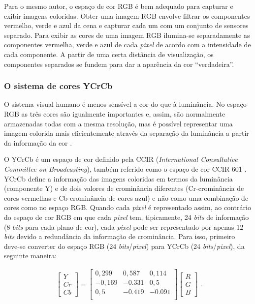 Para o mesmo autor, o espaço de cor RGB é bem adequado para capturar e exibir imagens coloridas. Obter uma imagem RGB envolve filtrar os componentes vermelho, verde e azul da cena e capturar cada um com um conjunto de sensores separado. Para exibir as cores de uma imagem RGB ilumina-se separadamente as componentes vermelha, verde e azul de cada \textit{pixel} de acordo com a intensidade de cada componente. A partir de uma certa distância de visualização, os componentes separados se fundem para dar a aparência da cor \enquote{verdadeira}. 

\subsubsection{O sistema de cores YCrCb}
O sistema visual humano é menos sensível a cor do que à luminância. No espaço RGB as três cores são igualmente importantes e, assim, são normalmente armazenadas todas com a mesma resolução, mas é possível representar uma imagem colorida mais eficientemente através da separação da luminância a partir da informação da cor \cite{richardson2011h}.

O YCrCb é um espaço de cor definido pela CCIR (\textit{International Consultative Committee on Broadcasting}), também referido como o espaço de cor CCIR 601 \cite{acharya2002integrated}. YCrCb define a informação  das imagens coloridas  em termos da luminância (componente Y) e de dois valores de crominância diferentes (Cr-crominância de cores vermelhas e Cb-crominância de cores azul) e não como uma combinação de cores como no espaço RGB. Quando cada \textit{pixel} é representado assim, ao contrário do espaço de cor RGB em que cada \textit{pixel} tem, tipicamente, 24 \textit{bits} de informação (8 \textit{bits} para cada plano de cor), cada \textit{pixel} pode ser representado por apenas 12 \textit{bits} devido a redundância da informação de crominância. Para isso, primeiro deve-se converter do espaço RGB (24 \textit{bits}/\textit{pixel}) para YCrCb (24 \textit{bits}/\textit{pixel}), da seguinte maneira:

\begin{center}
	\begin{equation}
	\begin{split}
	\begin{bmatrix}		
	Y\\ Cr \\ Cb
	\end{bmatrix}
	 = 
	\begin{bmatrix}
  		0,299 & 0,587 &  0,114 \\
  		-0,169 &-0.331 & 0,5 \\
  		0,5  & -0.419  & -0.091\\
	\end{bmatrix}
	\begin{bmatrix}
	R\\ G \\ B
	\end{bmatrix}
	\label{rgb2yuv} 
	\end{split}.
	\end{equation}

\end{center}


